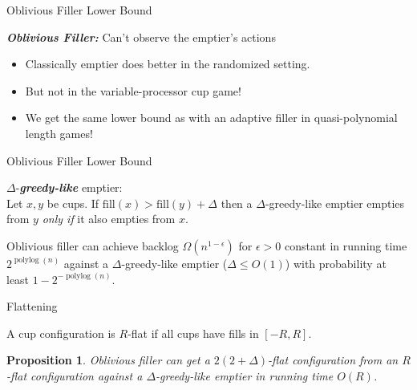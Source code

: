 \documentclass[xcolor=x11names, svgnames, rgb]{beamer}
\newcommand{\polylog}{\operatorname{polylog}}
\newcommand{\defn}[1]       {{\textit{\textbf{\boldmath #1}}}}
\newtheorem{proposition}{Proposition}
\begin{document}
\begin{frame}[t]{Oblivious Filler Lower Bound}
  \begin{definition}
    \defn{Oblivious Filler:}
    Can't observe the emptier's actions 
  \end{definition}

  \begin{itemize}
    \item Classically emptier does better in the randomized setting.
    \item But not in the variable-processor cup game!
    \item We get the same lower bound as with an adaptive filler in quasi-polynomial length games!
  \end{itemize}

\end{frame}

\begin{frame}[t]{Oblivious Filler Lower Bound}
  \begin{definition}
    $\Delta$-\defn{greedy-like} emptier: \\
    Let $x,y$ be cups. If $\text{fill}(x) > \text{fill}(y) + \Delta$ then a
    $\Delta$-greedy-like emptier empties from $y$ \emph{only if} it also
    empties from $x$.
  \end{definition}

  \vspace{0.5cm}
  Oblivious filler can achieve backlog $\Omega(n^{1-\epsilon})$ for $\epsilon
  >0 $ constant in running time $2^{\polylog(n)}$ against a
  $\Delta$-greedy-like emptier ($\Delta \le O(1)$) with probability at least
  $1-2^{-\polylog(n)}$.

\end{frame}

\begin{frame}[t]{Flattening}
 \begin{definition}
   A cup configuration is $R$-flat if all cups have fills in $[-R, R]$.
 \end{definition} 
 \vspace{1cm}
 \begin{proposition} 
   Oblivious filler can get a $2(2+\Delta)$-flat configuration from an
   $R$-flat configuration against a $\Delta$-greedy-like emptier in running
   time $O(R)$.
 \end{proposition}
\end{frame}
\end{document}
